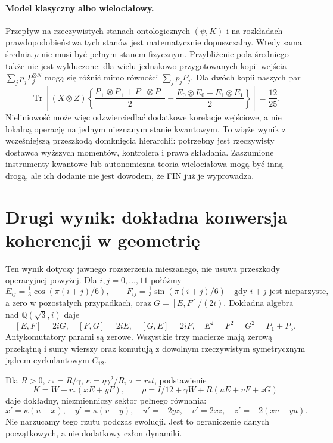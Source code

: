 \documentclass[11pt,a4paper]{article}
\newcommand{\Tr}{\operatorname{Tr}}
\begin{document}
\paragraph{Model klasyczny albo wielociałowy.}
Przepływ na rzeczywistych stanach ontologicznych $(\psi,K)$ i na
rozkładach prawdopodobieństwa tych stanów jest matematycznie dopuszczalny.
Wtedy sama średnia $\rho$ nie musi być pełnym stanem fizycznym.
Przybliżenie pola średniego także nie jest wykluczone: dla wielu
jednakowo przygotowanych kopii wejścia
$\sum_jp_jP_j^{\otimes N}$ mogą się różnić mimo równości
$\sum_jp_jP_j$. Dla dwóch kopii naszych par
\[
 \Tr\!\left[(X\otimes Z)
 \left\{\frac{P_+\otimes P_++P_-\otimes P_-}{2}
       -\frac{E_0\otimes E_0+E_1\otimes E_1}{2}\right\}\right]
 =\frac{12}{25}.
\]
Nieliniowość może więc odzwierciedlać dodatkowe korelacje wejściowe,
a nie lokalną operację na jednym nieznanym stanie kwantowym. To wiąże
wynik z wcześniejszą przeszkodą domknięcia hierarchii: potrzebny jest
rzeczywisty dostawca wyższych momentów, kontrolera i prawa składania.
Zaszumione instrumenty kwantowe lub autonomiczna teoria wielociałowa
mogą być inną drogą, ale ich dodanie nie jest dowodem, że FIN już je wyprowadza.

\section{Drugi wynik: dokładna konwersja koherencji w geometrię}

Ten wynik dotyczy jawnego rozszerzenia mieszanego, nie usuwa przeszkody
operacyjnej powyżej. Dla $i,j=0,\ldots,11$ połóżmy
\[
 E_{ij}=\tfrac13\cos(\pi(i+j)/6),\qquad
 F_{ij}=\tfrac13\sin(\pi(i+j)/6)
 \quad\text{gdy $i+j$ jest nieparzyste},
\]
a zero w pozostałych przypadkach, oraz $G=[E,F]/(2i)$.
Dokładna algebra nad $\mathbb Q(\sqrt3,i)$ daje
\[
 [E,F]=2iG,\quad[F,G]=2iE,\quad[G,E]=2iF,\quad
 E^2=F^2=G^2=P_1+P_5.
\]
Antykomutatory parami są zerowe. Wszystkie trzy macierze mają zerową
przekątną i sumy wierszy oraz komutują z dowolnym rzeczywistym
symetrycznym jądrem cyrkulantowym $C_{12}$.

Dla $R>0$, $r_*=R/\gamma$, $\kappa=\eta\gamma^2/R$, $\tau=r_*t$,
podstawienie
\[
 K=W+r_*(xE+yF),\qquad
 \rho=I/12+\gamma W+R(uE+vF+zG)
\]
daje dokładny, niezmienniczy sektor pełnego równania:
\begin{equation}\label{eq:spin}
 x'=\kappa(u-x),\quad y'=\kappa(v-y),\quad
 u'=-2yz,\quad v'=2xz,\quad z'=-2(xv-yu).
\end{equation}
Nie narzucamy tego rzutu podczas ewolucji. Jest to ograniczenie danych
początkowych, a nie dodatkowy człon dynamiki.
\end{document}
